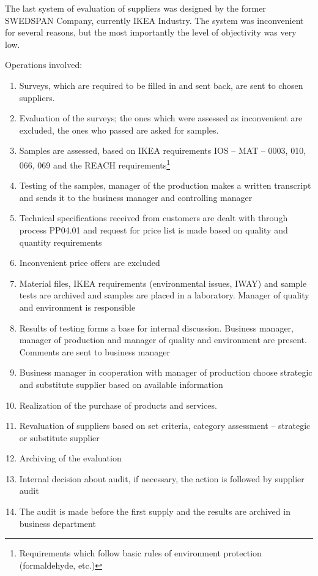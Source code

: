 \documentclass[oneside,12pt]{article}%
\begin{document}
The last system of evaluation of suppliers was designed by the former SWEDSPAN Company, currently IKEA Industry. The system was inconvenient for several reasons, but the most importantly the level of objectivity was very low.

Operations involved:

\begin{enumerate}
  \item Surveys, which are required to be filled in and sent back, are sent to chosen suppliers.
  \item Evaluation of the surveys; the ones which were assessed as inconvenient are excluded, the ones who passed are asked for samples.
  \item Samples are assessed, based on IKEA requirements IOS – MAT – 0003, 010, 066, 069  and the REACH requirements\footnote{Requirements which follow basic rules of environment protection (formaldehyde, etc.)}
  \item Testing of the samples, manager of the production makes a written transcript and sends it to the business manager and controlling manager
  \item Technical specifications received from customers are dealt with through process PP04.01 and request for price list is made based on quality and quantity requirements
  \item   Inconvenient price offers are excluded
  \item Material files, IKEA requirements (environmental issues, IWAY) and sample tests are archived and samples are placed in a laboratory. Manager of quality and environment is responsible
  \item Results of testing forms a base for internal discussion. Business manager, manager of production and manager of quality and environment are present. Comments are sent to business manager
  \item Business manager in cooperation with manager of production choose strategic and substitute supplier based on available information
  \item Realization of the purchase of products and services.
  \item Revaluation of suppliers based on set criteria, category assessment – strategic or substitute supplier
  \item Archiving of the evaluation
  \item Internal decision about audit, if necessary, the action is followed by supplier audit
  \item The audit is made before the first supply and the results are archived in business department

\end{enumerate}
\end{document}
